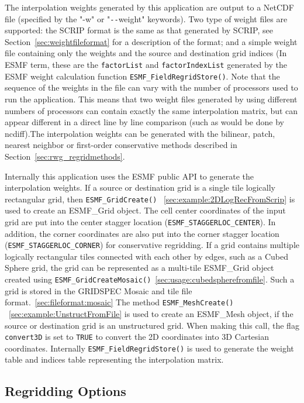 The interpolation weights generated by this application are output to a NetCDF file (specified by the "-w" or "\verb+--+weight"
keywords). Two type of weight files are supported: the SCRIP format is the same as that generated by SCRIP, see Section~\ref{sec:weightfileformat} for a description of the format; and a simple weight file containing only the weights and the source and destination grid indices (In ESMF
term, these are the {\tt factorList} and {\tt factorIndexList} generated by the ESMF weight calculation function {\tt ESMF\_FieldRegridStore()}.
Note that the sequence of the weights in the file can
vary with the number of processors used to run the application. This means that two weight files generated by using different
numbers of processors can contain exactly the same interpolation matrix, but can appear different in a direct line by line
comparison (such as would be done by ncdiff).The interpolation weights can be generated with
the bilinear, patch, nearest neighbor or first-order conservative methods described in Section~\ref{sec:rwg_regridmethods}.

        
Internally this application uses the ESMF public API to generate the interpolation weights.
If a source or destination grid is a single tile logically rectangular grid, then {\tt ESMF\_GridCreate()}
~\ref{sec:example:2DLogRecFromScrip}
is used to create an ESMF\_Grid object. The cell center
coordinates of the input grid are put into the center stagger location ({\tt ESMF\_STAGGERLOC\_CENTER}).
In addition, the corner coordinates are also put into the corner stagger location
({\tt ESMF\_STAGGERLOC\_CORNER}) for conservative regridding.  If a grid contains multiple logically rectangular tiles 
connected with each other by edges, such as a Cubed Sphere grid, the grid can be represented as a multi-tile ESMF\_Grid object created 
using {\tt ESMF\_GridCreateMosaic()}~\ref{sec:usage:cubedspherefromfile}. Such a grid is stored in the GRIDSPEC Mosaic and tile file format.~\ref{sec:fileformat:mosaic}
The method {\tt ESMF\_MeshCreate()} ~\ref{sec:example:UnstructFromFile}
is used to create an ESMF\_Mesh object, if the
source or destination grid is an unstructured grid. When making this call,
the flag {\tt convert3D} is set to {\tt TRUE} to convert the 2D coordinates into 3D Cartesian coordinates. 
Internally {\tt ESMF\_FieldRegridStore()} is used to generate the weight table and indices table representing the interpolation matrix.


\subsection{Regridding Options}\label{sec:rwg_options}

